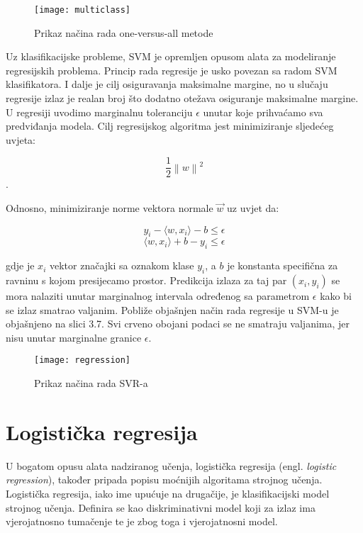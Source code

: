\documentclass[times, utf8, zavrsni]{fer}
\begin{document}
 \begin{figure}[h]
 	\centering
 	\texttt{[image: multiclass]}
 	\caption{Prikaz načina rada one-versus-all metode\protect\footnotemark}
 \end{figure}


Uz klasifikacijske probleme, SVM je opremljen opusom alata za modeliranje regresijskih problema. Princip rada regresije je usko povezan sa radom SVM klasifikatora. I dalje je cilj osiguravanja maksimalne margine, no u slučaju regresije izlaz je realan broj što dodatno otežava osiguranje maksimalne margine. U regresiji uvodimo marginalnu toleranciju $\epsilon$ unutar koje prihvaćamo sva predviđanja modela. Cilj regresijskog algoritma jest minimiziranje sljedećeg uvjeta: 

$$\frac{1}{2}\left\lVert w\right\rVert^2$$.

Odnosno, minimiziranje norme vektora normale $\overrightarrow{w}$ uz uvjet da: 

$$ y_{i} - \langle w,x_{i} \rangle - b \leq \epsilon $$
$$ \langle w,x_{i} \rangle + b - y_{i} \leq \epsilon$$

gdje je $x_{i}$ vektor značajki sa oznakom klase $y_{i}$, a $b$ je konstanta specifična za ravninu s kojom presijecamo prostor. Predikcija izlaza za taj par $(x_{i},y_{i})$ se mora nalaziti unutar marginalnog intervala određenog sa parametrom $\epsilon$ kako bi se izlaz smatrao valjanim. Pobliže objašnjen način rada regresije u SVM-u je objašnjeno na slici 3.7. Svi crveno obojani podaci se ne smatraju valjanima, jer nisu unutar marginalne granice $\epsilon$. 

 \begin{figure}[h]
	\centering
	\texttt{[image: regression]}
	\caption{Prikaz načina rada SVR-a \protect\footnotemark}
\end{figure}




\newpage
\section{Logistička regresija}

U bogatom opusu alata nadziranog učenja, logistička regresija (engl. \textit{logistic regression}), također pripada popisu moćnijih algoritama strojnog učenja. Logistička regresija, iako ime upućuje na drugačije, je klasifikacijski model strojnog učenja. Definira se kao diskriminativni model koji za izlaz ima vjerojatnosno tumačenje te je zbog toga i vjerojatnosni model.
\end{document}
